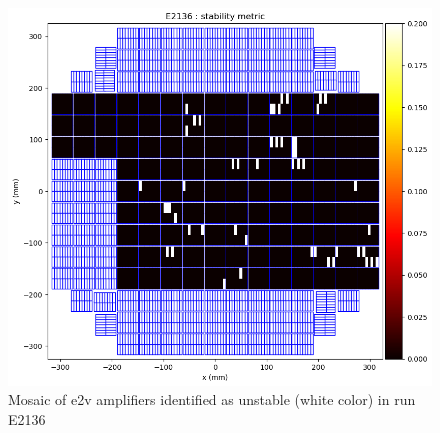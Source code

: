 \begin{figure}[htbp]
\begin{minipage}{0.45\textwidth}
    \includegraphics[width=\textwidth]{figures/E2136_mosaic_d.png}
    \caption{Mosaic of e2v amplifiers identified as unstable (white color) in run E2136}
    \label{fig:stability_mosaic}
\end{minipage}
\end{figure}

%


\clearpage
